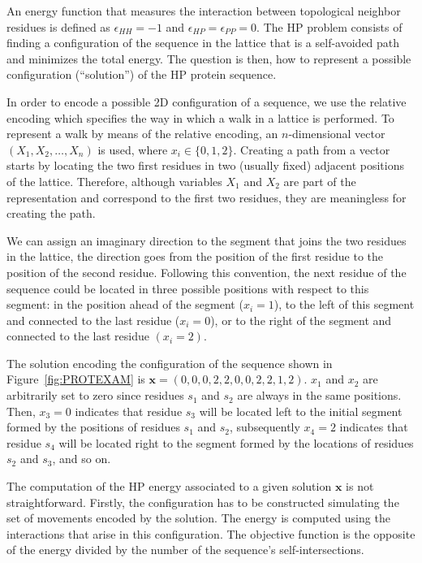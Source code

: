   An energy function that  measures the interaction  between topological  neighbor residues is defined  as  $\epsilon_{HH}=-1$ and  $\epsilon_{HP}=\epsilon_{PP}=0$. The HP problem consists of  finding a configuration of the sequence in the lattice that is a self-avoided path and minimizes the total energy. The question is then, how to represent a possible configuration (``solution'') of the HP protein sequence. 

  In order to encode a possible 2D configuration of a sequence, we use the relative encoding \cite{Krasnogor_et_al:1999} which specifies the way in which a walk in a lattice is performed. To represent a walk by means of the relative encoding, an $n$-dimensional vector $(X_1,X_2,\dots, X_n)$ is used, where $x_i \in \{0,1,2\}$. Creating a path from a vector starts by locating the two first residues in two (usually fixed) adjacent positions of the lattice. Therefore, although variables $X_1$ and $X_2$ are part of the representation and correspond to the first two residues, they are meaningless for creating the path.

   We can assign an imaginary  direction to the segment that joins the two residues in the lattice, the direction goes from the position of the first residue to the position of the second residue. Following this convention, the next residue of the sequence could be located in three possible positions with respect to this segment: in the position ahead of the segment ($x_i=1$), to the left of this segment  and connected to the last residue ($x_i=0$), or to the right of the segment and connected to the last residue $(x_i=2)$.

  The solution encoding the configuration of the sequence shown in Figure~\ref{fig:PROTEXAM} is $\textbf{x} = (0,0,0,2,2,0,0,2,2,1,2)$. $x_1$ and $x_2$ are arbitrarily set to zero since residues $s_1$ and $s_2$ are always in the same positions. Then, $x_3=0$ indicates that residue $s_3$ will be located  left  to the initial segment formed by the positions of residues $s_1$ and $s_2$, subsequently  $x_4=2$ indicates that residue $s_4$ will be located  right to the segment formed by the locations of residues $s_2$ and $s_3$, and so on.  

 The computation of the HP energy associated to a given solution  $\textbf{x}$ is not straightforward. Firstly,  the configuration has to be constructed simulating the set of movements encoded by the solution. The energy is computed using the interactions that arise in this configuration. The objective function  is the opposite of the energy divided by the number of the sequence's self-intersections.  

